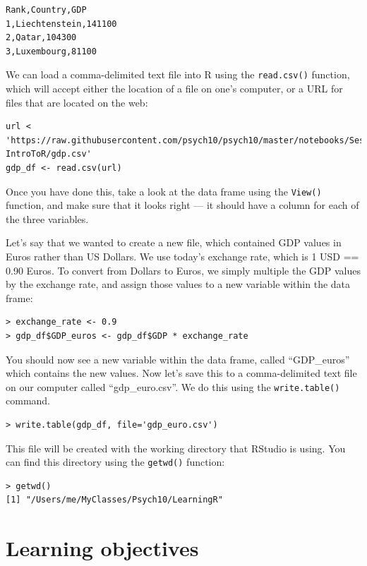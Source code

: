 \documentclass[
  12pt,
]{book}
\begin{document}
\begin{verbatim}
Rank,Country,GDP
1,Liechtenstein,141100
2,Qatar,104300
3,Luxembourg,81100
\end{verbatim}

We can load a comma-delimited text file into R using the \texttt{read.csv()} function, which will accept either the location of a file on one's computer, or a URL for files that are located on the web:

\begin{verbatim}
url < 'https://raw.githubusercontent.com/psych10/psych10/master/notebooks/Session03-IntroToR/gdp.csv'
gdp_df <- read.csv(url)
\end{verbatim}

Once you have done this, take a look at the data frame using the \texttt{View()} function, and make sure that it looks right --- it should have a column for each of the three variables.

Let's say that we wanted to create a new file, which contained GDP values in Euros rather than US Dollars. We use today's exchange rate, which is 1 USD == 0.90 Euros. To convert from Dollars to Euros, we simply multiple the GDP values by the exchange rate, and assign those values to a new variable within the data frame:

\begin{verbatim}
> exchange_rate <- 0.9
> gdp_df$GDP_euros <- gdp_df$GDP * exchange_rate
\end{verbatim}

You should now see a new variable within the data frame, called ``GDP\_euros'' which contains the new values. Now let's save this to a comma-delimited text file on our computer called ``gdp\_euro.csv''.
We do this using the \texttt{write.table()} command.

\begin{verbatim}
> write.table(gdp_df, file='gdp_euro.csv')
\end{verbatim}

This file will be created with the working directory that RStudio is using. You can find this directory using the \texttt{getwd()} function:

\begin{verbatim}
> getwd()
[1] "/Users/me/MyClasses/Psych10/LearningR"
\end{verbatim}

\hypertarget{learning-objectives}{%
\section{Learning objectives}\label{learning-objectives}}
\end{document}
